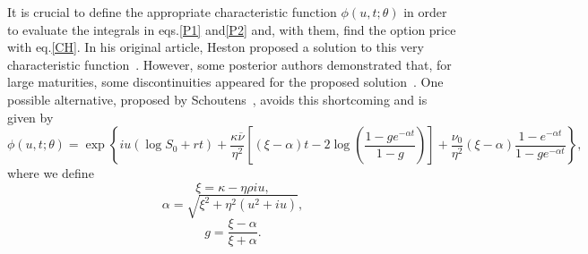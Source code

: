 It is crucial to define the appropriate characteristic function $\phi(u,t;\theta)$ in order to evaluate the integrals in eqs.\eqref{P1} and\eqref{P2} and, with them, find the option price with eq.\eqref{CH}. In his original article, Heston proposed a solution to this very characteristic function~\citep{Heston}. However, some posterior authors demonstrated that, for large maturities, some discontinuities appeared for the proposed solution~\citep{Kahl}. One possible alternative, proposed by Schoutens~\citep{Schoutens}, avoids this shortcoming and is given by
\begin{equation}\label{charfuncschoutens}
\phi(u,t;\theta)=\exp\left\{iu\left(\log S_0+rt\right)+\frac{\kappa\overline{\nu}}{\eta^2}\left[\left(\xi-\alpha\right)t-2\log\left(\frac{1-ge^{-\alpha t}}{1-g}\right)\right]+\frac{\nu_0}{\eta^2}\left(\xi-\alpha\right)\frac{1-e^{-\alpha t}}{1-ge^{-\alpha t}}\right\},
\end{equation}
\noindent where we define
\begin{equation}\label{xi}
\xi=\kappa-\eta\rho iu,
\end{equation}
\begin{equation}\label{alpha}
\alpha=\sqrt{\xi^2+\eta^2(u^2+iu)},
\end{equation}
\begin{equation}
g=\frac{\xi-\alpha}{\xi+\alpha}.
\end{equation}


